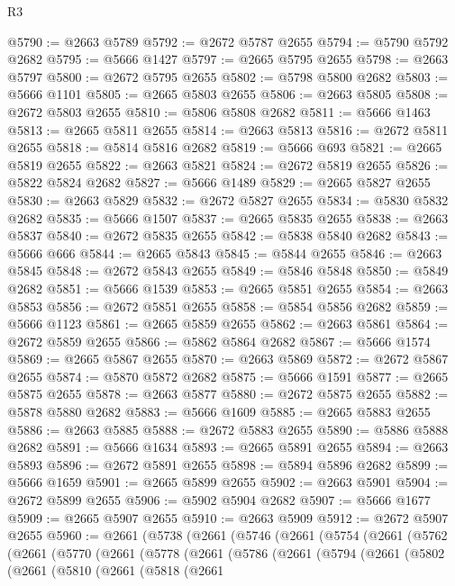 \begin{lexlean}{R3}
\begin{coremodule}
@5790 := @2663 @5789
@5792 := @2672 @5787 @2655
@5794 := @5790 @5792 @2682
@5795 := @5666 @1427
@5797 := @2665 @5795 @2655
@5798 := @2663 @5797
@5800 := @2672 @5795 @2655
@5802 := @5798 @5800 @2682
@5803 := @5666 @1101
@5805 := @2665 @5803 @2655
@5806 := @2663 @5805
@5808 := @2672 @5803 @2655
@5810 := @5806 @5808 @2682
@5811 := @5666 @1463
@5813 := @2665 @5811 @2655
@5814 := @2663 @5813
@5816 := @2672 @5811 @2655
@5818 := @5814 @5816 @2682
@5819 := @5666 @693
@5821 := @2665 @5819 @2655
@5822 := @2663 @5821
@5824 := @2672 @5819 @2655
@5826 := @5822 @5824 @2682
@5827 := @5666 @1489
@5829 := @2665 @5827 @2655
@5830 := @2663 @5829
@5832 := @2672 @5827 @2655
@5834 := @5830 @5832 @2682
@5835 := @5666 @1507
@5837 := @2665 @5835 @2655
@5838 := @2663 @5837
@5840 := @2672 @5835 @2655
@5842 := @5838 @5840 @2682
@5843 := @5666 @666
@5844 := @2665 @5843
@5845 := @5844 @2655
@5846 := @2663 @5845
@5848 := @2672 @5843 @2655
@5849 := @5846 @5848
@5850 := @5849 @2682
@5851 := @5666 @1539
@5853 := @2665 @5851 @2655
@5854 := @2663 @5853
@5856 := @2672 @5851 @2655
@5858 := @5854 @5856 @2682
@5859 := @5666 @1123
@5861 := @2665 @5859 @2655
@5862 := @2663 @5861
@5864 := @2672 @5859 @2655
@5866 := @5862 @5864 @2682
@5867 := @5666 @1574
@5869 := @2665 @5867 @2655
@5870 := @2663 @5869
@5872 := @2672 @5867 @2655
@5874 := @5870 @5872 @2682
@5875 := @5666 @1591
@5877 := @2665 @5875 @2655
@5878 := @2663 @5877
@5880 := @2672 @5875 @2655
@5882 := @5878 @5880 @2682
@5883 := @5666 @1609
@5885 := @2665 @5883 @2655
@5886 := @2663 @5885
@5888 := @2672 @5883 @2655
@5890 := @5886 @5888 @2682
@5891 := @5666 @1634
@5893 := @2665 @5891 @2655
@5894 := @2663 @5893
@5896 := @2672 @5891 @2655
@5898 := @5894 @5896 @2682
@5899 := @5666 @1659
@5901 := @2665 @5899 @2655
@5902 := @2663 @5901
@5904 := @2672 @5899 @2655
@5906 := @5902 @5904 @2682
@5907 := @5666 @1677
@5909 := @2665 @5907 @2655
@5910 := @2663 @5909
@5912 := @2672 @5907 @2655
@5960 := @2661
    (@5738
      (@2661
        (@5746
          (@2661
            (@5754
              (@2661
                (@5762
                  (@2661
                    (@5770
                      (@2661
                        (@5778
                          (@2661
                            (@5786
                              (@2661
                                (@5794
                                  (@2661
                                    (@5802
                                      (@2661
                                        (@5810
                                          (@2661
                                            (@5818
                                              (@2661

\end{coremodule}
\end{lexlean}
